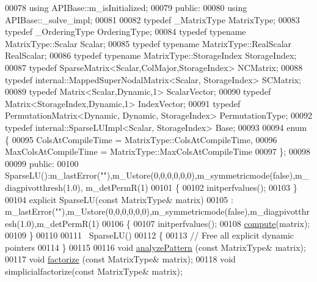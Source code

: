 \begin{DoxyCode}
00078     \textcolor{keyword}{using} APIBase::m\_isInitialized;
00079   \textcolor{keyword}{public}:
00080     \textcolor{keyword}{using} APIBase::\_solve\_impl;
00081     
00082     \textcolor{keyword}{typedef} \_MatrixType MatrixType; 
00083     \textcolor{keyword}{typedef} \_OrderingType OrderingType;
00084     \textcolor{keyword}{typedef} \textcolor{keyword}{typename} MatrixType::Scalar Scalar; 
00085     \textcolor{keyword}{typedef} \textcolor{keyword}{typename} MatrixType::RealScalar RealScalar; 
00086     \textcolor{keyword}{typedef} \textcolor{keyword}{typename} MatrixType::StorageIndex StorageIndex;
00087     \textcolor{keyword}{typedef} SparseMatrix<Scalar,ColMajor,StorageIndex> NCMatrix;
00088     \textcolor{keyword}{typedef} internal::MappedSuperNodalMatrix<Scalar, StorageIndex> SCMatrix;
00089     \textcolor{keyword}{typedef} Matrix<Scalar,Dynamic,1> ScalarVector;
00090     \textcolor{keyword}{typedef} Matrix<StorageIndex,Dynamic,1> IndexVector;
00091     \textcolor{keyword}{typedef} PermutationMatrix<Dynamic, Dynamic, StorageIndex> PermutationType;
00092     \textcolor{keyword}{typedef} internal::SparseLUImpl<Scalar, StorageIndex> Base;
00093 
00094     \textcolor{keyword}{enum} \{
00095       ColsAtCompileTime = MatrixType::ColsAtCompileTime,
00096       MaxColsAtCompileTime = MatrixType::MaxColsAtCompileTime
00097     \};
00098     
00099   \textcolor{keyword}{public}:
00100     SparseLU():m\_lastError(\textcolor{stringliteral}{""}),m\_Ustore(0,0,0,0,0,0),m\_symmetricmode(false),m\_diagpivotthresh(1.0),
      m\_detPermR(1)
00101     \{
00102       initperfvalues(); 
00103     \}
00104     \textcolor{keyword}{explicit} SparseLU(\textcolor{keyword}{const} MatrixType& matrix)
00105       : m\_lastError(\textcolor{stringliteral}{""}),m\_Ustore(0,0,0,0,0,0),m\_symmetricmode(false),m\_diagpivotthresh(1.0),m\_detPermR(1)
00106     \{
00107       initperfvalues(); 
00108       \hyperlink{group___sparse_l_u___module_a96a8dcb02015ab9be5777d4ba9173266}{compute}(matrix);
00109     \}
00110     
00111     ~SparseLU()
00112     \{
00113       \textcolor{comment}{// Free all explicit dynamic pointers }
00114     \}
00115     
00116     \textcolor{keywordtype}{void} \hyperlink{group___sparse_l_u___module_aa907ff958c4f4855145091d2686f3a8a}{analyzePattern} (\textcolor{keyword}{const} MatrixType& matrix);
00117     \textcolor{keywordtype}{void} \hyperlink{group___sparse_l_u___module_a39858b0e72f2659d596364e252b34cbc}{factorize} (\textcolor{keyword}{const} MatrixType& matrix);
00118     \textcolor{keywordtype}{void} simplicialfactorize(\textcolor{keyword}{const} MatrixType& matrix);

\end{DoxyCode}
